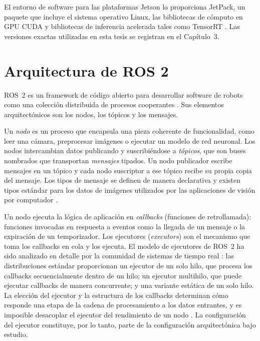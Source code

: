 El entorno de software para las plataformas Jetson lo proporciona JetPack,
un paquete que incluye el sistema operativo Linux, las bibliotecas de
cómputo en GPU CUDA y bibliotecas de inferencia acelerada tales como
TensorRT \cite{szegedi2026, zequn2026}. Las versiones exactas utilizadas en
esta tesis se registran en el Capítulo~3.

\section{Arquitectura de ROS 2}
\label{sec:ros2}

ROS~2 es un framework de código abierto para desarrollar software de robots
como una colección distribuida de procesos cooperantes
\cite{macenski2022,zotero-item-9}. Sus elementos arquitectónicos son los
nodos, los tópicos y los mensajes.

Un \emph{nodo} es un proceso que encapsula una pieza coherente de
funcionalidad, como leer una cámara, preprocesar imágenes o ejecutar un
modelo de red neuronal. Los nodos intercambian datos publicando y
suscribiéndose a \emph{tópicos}, que son buses nombrados que transportan
\emph{mensajes} tipados. Un nodo publicador escribe mensajes en un tópico y
cada nodo suscriptor a ese tópico recibe su propia copia del mensaje. Los
tipos de mensaje se definen de manera declarativa y existen tipos estándar
para los datos de imágenes utilizados por las aplicaciones de visión por
computador \cite{macenski2022, zotero-item-9}.

Un nodo ejecuta la lógica de aplicación en \emph{callbacks} (funciones de
retrollamada): funciones invocadas en respuesta a eventos como la llegada de
un mensaje o la expiración de un temporizador. Los ejecutores
(\emph{executors}) son el mecanismo que toma los callbacks en cola y los
ejecuta. El modelo de ejecutores de ROS~2 ha sido analizado en detalle por
la comunidad de sistemas de tiempo real \cite{casini2026}: las
distribuciones estándar proporcionan un ejecutor de un solo hilo, que
procesa los callbacks secuencialmente dentro de un hilo; un ejecutor
multihilo, que puede ejecutar callbacks de manera concurrente; y una
variante estática de un solo hilo. La elección del ejecutor y la estructura
de los callbacks determinan cómo responde una etapa de la cadena de
procesamiento a los datos entrantes, y es imposible desacoplar el ejecutor
del rendimiento de un nodo \cite{macenski2023, casini2026}. La configuración
del ejecutor constituye, por lo tanto, parte de la configuración
arquitectónica bajo estudio.

